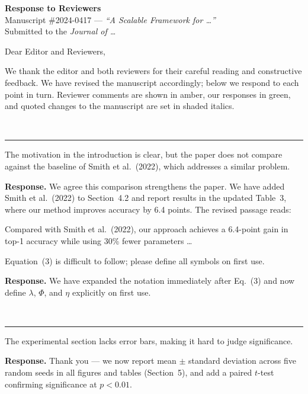 \documentclass[11pt,a4paper]{article}
\newenvironment{response}%
  {\par\vspace{3pt}\begin{tcolorbox}[breakable,enhanced,boxrule=0pt,
     colback=white,left=12pt,right=6pt,top=4pt,bottom=4pt,
     borderline west={2.4pt}{0pt}{response}]%
   \textbf{\color{response}Response.}\enspace}%
  {\end{tcolorbox}}
\newcommand{\reviewer}[1]{%
  \bigskip{\color{editor}\Large\bfseries Reviewer~#1}\\[-4pt]
  {\color{editor}\rule{\linewidth}{1pt}}\par\medskip}
\begin{document}
{\color{editor}\LARGE\bfseries Response to Reviewers}\\[4pt]
{\large Manuscript \#2024-0417 — \textit{``A Scalable Framework for \dots''}}\\[6pt]
{\color{editor!80}Submitted to the \textit{Journal of \dots}}
\medskip

\noindent Dear Editor and Reviewers,
\smallskip

We thank the editor and both reviewers for their careful reading and constructive feedback.
We have revised the manuscript accordingly; below we respond to each point in turn.
Reviewer comments are shown in \textcolor{reviewer}{amber}, our responses in
\textcolor{response}{green}, and quoted changes to the manuscript are set in shaded italics.

\reviewer{1}

\begin{rvcomment}[1.1]
The motivation in the introduction is clear, but the paper does not compare against the
baseline of Smith et al.\ (2022), which addresses a similar problem.
\end{rvcomment}
\begin{response}
We agree this comparison strengthens the paper. We have added Smith et al.\ (2022) to
Section~4.2 and report results in the updated Table~3, where our method improves accuracy
by 6.4 points. The revised passage reads:
\begin{revised}
Compared with Smith et al.\ (2022), our approach achieves a 6.4-point gain in top-1
accuracy while using 30\% fewer parameters \dots
\end{revised}
\end{response}

\begin{rvcomment}[1.2]
Equation~(3) is difficult to follow; please define all symbols on first use.
\end{rvcomment}
\begin{response}
We have expanded the notation immediately after Eq.~(3) and now define
$\lambda$, $\Phi$, and $\eta$ explicitly on first use.
\end{response}

\reviewer{2}

\begin{rvcomment}[2.1]
The experimental section lacks error bars, making it hard to judge significance.
\end{rvcomment}
\begin{response}
Thank you — we now report mean $\pm$ standard deviation across five random seeds in all
figures and tables (Section~5), and add a paired $t$-test confirming significance at
$p < 0.01$.
\end{response}
\end{document}
